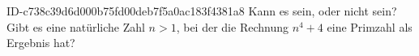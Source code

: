 \begin{exercise}
      {ID-c738c39d6d000b75fd00deb7f5a0ac183f4381a8}
      {Kann es sein, oder nicht sein?}
  \ifproblem\problem
    Gibt es eine natürliche Zahl $n>1$, bei der die Rechnung $n^{4}+4$ eine
    Primzahl als Ergebnis hat?
  \fi
\end{exercise}
